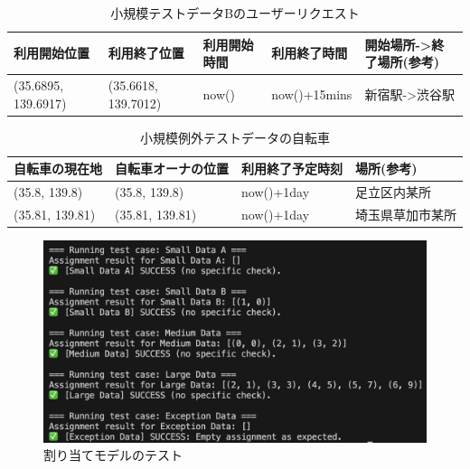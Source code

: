           \begin{table}[t]
            \caption{小規模テストデータBのユーザーリクエスト}
            \label{tab:小規模テストデータBのユーザーリクエスト}
            \centering
            \begin{tabular}{|l|l|l|l|l|} \hline
              利用開始位置 & 利用終了位置 & 利用開始時間 & 利用終了時間 & 開始場所->終了場所(参考) \\ \hline
              (35.6895, 139.6917) & (35.6618, 139.7012) & now() & now()+15mins & 新宿駅->渋谷駅 \\ \hline
            \end{tabular}
          \end{table}

          \begin{table}[t]
            \caption{小規模例外テストデータの自転車}
            \label{tab:小規模例外テストデータの自転車}
            \centering
            \begin{tabular}{|l|l|l|l|} \hline
              自転車の現在地 & 自転車オーナの位置 & 利用終了予定時刻 & 場所(参考) \\ \hline
              (35.8, 139.8) & (35.8, 139.8) & now()+1day & 足立区内某所 \\
              (35.81, 139.81) & (35.81, 139.81) & now()+1day & 埼玉県草加市某所 \\ \hline
            \end{tabular}
          \end{table}

          \begin{figure}[htbp]
            \centering
            \includegraphics[scale=0.29]
            {figures/TestResult.png}
            \caption{割り当てモデルのテスト}
            \label{fig:割り当てモデルのテスト}
          \end{figure}

